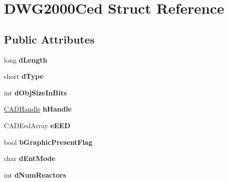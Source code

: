 \hypertarget{struct_d_w_g2000_ced}{}\section{D\+W\+G2000\+Ced Struct Reference}
\label{struct_d_w_g2000_ced}
\subsection*{Public Attributes}
\begin{DoxyCompactItemize}
\item 
long {\bfseries d\+Length}\hypertarget{struct_d_w_g2000_ced_ad20279a61bfdd46bf85432e9301924ee}{}\label{struct_d_w_g2000_ced_ad20279a61bfdd46bf85432e9301924ee}

\item 
short {\bfseries d\+Type}\hypertarget{struct_d_w_g2000_ced_a4206fc0f2075514a4a85d543ce3ee110}{}\label{struct_d_w_g2000_ced_a4206fc0f2075514a4a85d543ce3ee110}

\item 
int {\bfseries d\+Obj\+Size\+In\+Bits}\hypertarget{struct_d_w_g2000_ced_a81d248f6b16dbc56356806a98ab5e00e}{}\label{struct_d_w_g2000_ced_a81d248f6b16dbc56356806a98ab5e00e}

\item 
\hyperlink{class_c_a_d_handle}{C\+A\+D\+Handle} {\bfseries h\+Handle}\hypertarget{struct_d_w_g2000_ced_af31be920bff46745241e1fc56075eeda}{}\label{struct_d_w_g2000_ced_af31be920bff46745241e1fc56075eeda}

\item 
C\+A\+D\+Eed\+Array {\bfseries e\+E\+ED}\hypertarget{struct_d_w_g2000_ced_ae0aa878f841a4831397e9561133ad529}{}\label{struct_d_w_g2000_ced_ae0aa878f841a4831397e9561133ad529}

\item 
bool {\bfseries b\+Graphic\+Present\+Flag}\hypertarget{struct_d_w_g2000_ced_a8af9529ead8ecf4efec0603fa1cdfd11}{}\label{struct_d_w_g2000_ced_a8af9529ead8ecf4efec0603fa1cdfd11}

\item 
char {\bfseries d\+Ent\+Mode}\hypertarget{struct_d_w_g2000_ced_a0106cbc7dd19b71e21e3c7977df7fc74}{}\label{struct_d_w_g2000_ced_a0106cbc7dd19b71e21e3c7977df7fc74}

\item 
int {\bfseries d\+Num\+Reactors}\hypertarget{struct_d_w_g2000_ced_a63c4e2887ee15a550af403e221a04b33}{}\label{struct_d_w_g2000_ced_a63c4e2887ee15a550af403e221a04b33}


\end{DoxyCompactItemize}
